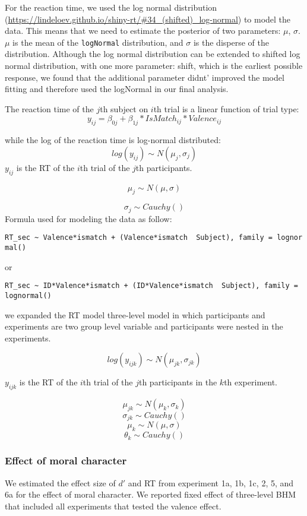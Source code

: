 \documentclass[
  man]{apa6}
\begin{document}
For the reaction time, we used the log normal distribution (\url{https://lindeloev.github.io/shiny-rt/\#34_(shifted)_log-normal}) to model the data. This means that we need to estimate the posterior of two parameters: \(\mu\), \(\sigma\). \(\mu\) is the mean of the \texttt{logNormal} distribution, and \(\sigma\) is the disperse of the distribution. Although the log normal distribution can be extended to shifted log normal distribution, with one more parameter: shift, which is the earliest possible response, we found that the additional parameter didnt' improved the model fitting and therefore used the logNormal in our final analysis.

The reaction time of the \(j\)th subject on \(i\)th trial is a linear function of trial type: \[y_{ij} = \beta_{0j} + \beta_{1j}*IsMatch_{ij} * Valence_{ij}\]

while the log of the reaction time is log-normal distributed:
\[ log(y_{ij}) \sim N(\mu_{j}, \sigma_{j})\]
\(y_{ij}\) is the RT of the \(i\)th trial of the \(j\)th participants.

\[\mu_{j} \sim N(\mu, \sigma)\]

\[\sigma_{j} \sim Cauchy()\]
Formula used for modeling the data as follow:

\texttt{RT\_sec\ \textasciitilde{}\ Valence*ismatch\ +\ (Valence*ismatch\ \textbar{}\ Subject),\ family\ =\ lognormal()}

or

\texttt{RT\_sec\ \textasciitilde{}\ ID*Valence*ismatch\ +\ (ID*Valence*ismatch\ \textbar{}\ Subject),\ family\ =\ lognormal()}

we expanded the RT model three-level model in which participants and experiments are two group level variable and participants were nested in the experiments.

\[ log(y_{ijk}) \sim N(\mu_{jk}, \sigma_{jk})\]

\(y_{ijk}\) is the RT of the \(i\)th trial of the \(j\)th participants in the \(k\)th experiment.

\[\mu_{jk} \sim N(\mu_{k}, \sigma_{k})\]
\[\sigma_{jk} \sim Cauchy()\]
\[\mu_{k} \sim N(\mu, \sigma)\]
\[\theta_{k} \sim Cauchy()\]

\hypertarget{effect-of-moral-character}{%
\subsubsection{Effect of moral character}\label{effect-of-moral-character}}

We estimated the effect size of \(d'\) and RT from experiment 1a, 1b, 1c, 2, 5, and 6a for the effect of moral character. We reported fixed effect of three-level BHM that included all experiments that tested the valence effect.
\end{document}
